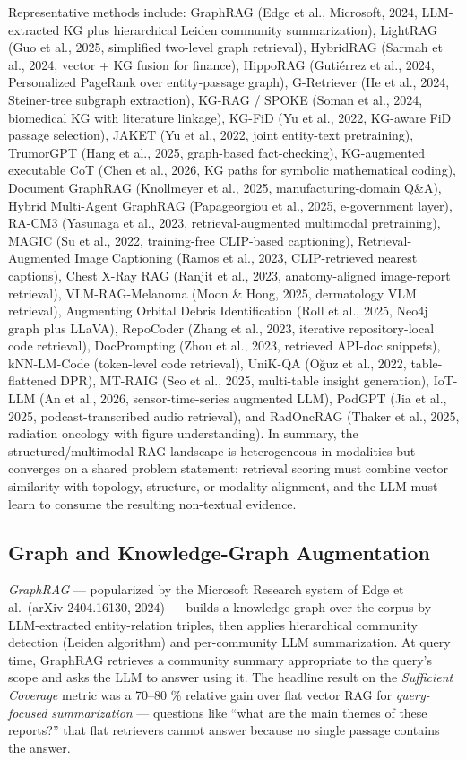 \documentclass{article}
\begin{document}
Representative methods include: GraphRAG (Edge et al., Microsoft, 2024, LLM-extracted KG plus hierarchical Leiden community summarization), LightRAG (Guo et al., 2025, simplified two-level graph retrieval), HybridRAG (Sarmah et al., 2024, vector + KG fusion for finance), HippoRAG (Gutiérrez et al., 2024, Personalized PageRank over entity-passage graph), G-Retriever (He et al., 2024, Steiner-tree subgraph extraction), KG-RAG / SPOKE (Soman et al., 2024, biomedical KG with literature linkage), KG-FiD (Yu et al., 2022, KG-aware FiD passage selection), JAKET (Yu et al., 2022, joint entity-text pretraining), TrumorGPT (Hang et al., 2025, graph-based fact-checking), KG-augmented executable CoT (Chen et al., 2026, KG paths for symbolic mathematical coding), Document GraphRAG (Knollmeyer et al., 2025, manufacturing-domain Q\&A), Hybrid Multi-Agent GraphRAG (Papageorgiou et al., 2025, e-government layer), RA-CM3 (Yasunaga et al., 2023, retrieval-augmented multimodal pretraining), MAGIC (Su et al., 2022, training-free CLIP-based captioning), Retrieval-Augmented Image Captioning (Ramos et al., 2023, CLIP-retrieved nearest captions), Chest X-Ray RAG (Ranjit et al., 2023, anatomy-aligned image-report retrieval), VLM-RAG-Melanoma (Moon \& Hong, 2025, dermatology VLM retrieval), Augmenting Orbital Debris Identification (Roll et al., 2025, Neo4j graph plus LLaVA), RepoCoder (Zhang et al., 2023, iterative repository-local code retrieval), DocPrompting (Zhou et al., 2023, retrieved API-doc snippets), kNN-LM-Code (token-level code retrieval), UniK-QA (Oğuz et al., 2022, table-flattened DPR), MT-RAIG (Seo et al., 2025, multi-table insight generation), IoT-LLM (An et al., 2026, sensor-time-series augmented LLM), PodGPT (Jia et al., 2025, podcast-transcribed audio retrieval), and RadOncRAG (Thaker et al., 2025, radiation oncology with figure understanding). In summary, the structured/multimodal RAG landscape is heterogeneous in modalities but converges on a shared problem statement: retrieval scoring must combine vector similarity with topology, structure, or modality alignment, and the LLM must learn to consume the resulting non-textual evidence.

\subsection{Graph and Knowledge-Graph Augmentation}\label{graph-and-knowledge-graph-augmentation}

\emph{GraphRAG} --- popularized by the Microsoft Research system of Edge et al.~(arXiv 2404.16130, 2024) --- builds a knowledge graph over the corpus by LLM-extracted entity-relation triples, then applies hierarchical community detection (Leiden algorithm) and per-community LLM summarization. At query time, GraphRAG retrieves a community summary appropriate to the query's scope and asks the LLM to answer using it. The headline result on the \emph{Sufficient Coverage} metric was a 70--80 \% relative gain over flat vector RAG for \emph{query-focused summarization} --- questions like ``what are the main themes of these reports?'' that flat retrievers cannot answer because no single passage contains the answer.
\end{document}
